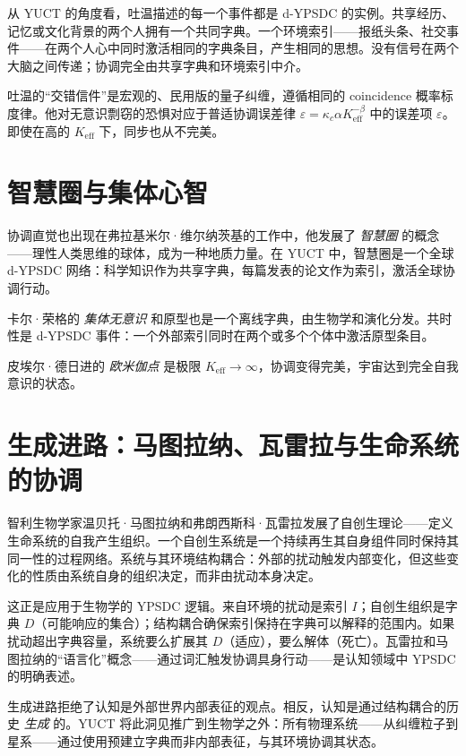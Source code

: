 \documentclass[12pt,a4paper]{article}
\begin{document}
	从 YUCT 的角度看，吐温描述的每一个事件都是 d-YPSDC 的实例。共享经历、记忆或文化背景的两个人拥有一个共同字典。一个环境索引——报纸头条、社交事件——在两个人心中同时激活相同的字典条目，产生相同的思想。没有信号在两个大脑之间传递；协调完全由共享字典和环境索引中介。
	
	吐温的“交错信件”是宏观的、民用版的量子纠缠，遵循相同的 coincidence 概率标度律。他对无意识剽窃的恐惧对应于普适协调误差律 \(\varepsilon = \kappa_c \alpha K_{\mathrm{eff}}^{-\beta}\) 中的误差项 \(\varepsilon\)。即使在高的 \(K_{\mathrm{eff}}\) 下，同步也从不完美。
	
	\section{智慧圈与集体心智}
	
	协调直觉也出现在弗拉基米尔·维尔纳茨基的工作中，他发展了 \emph{智慧圈} 的概念——理性人类思维的球体，成为一种地质力量。在 YUCT 中，智慧圈是一个全球 d-YPSDC 网络：科学知识作为共享字典，每篇发表的论文作为索引，激活全球协调行动。
	
	卡尔·荣格的 \emph{集体无意识} 和原型也是一个离线字典，由生物学和演化分发。共时性是 d-YPSDC 事件：一个外部索引同时在两个或多个个体中激活原型条目。
	
	皮埃尔·德日进的 \emph{欧米伽点} 是极限 \(K_{\mathrm{eff}} \to \infty\)，协调变得完美，宇宙达到完全自我意识的状态。
	
	\section{生成进路：马图拉纳、瓦雷拉与生命系统的协调}
	
	智利生物学家温贝托·马图拉纳和弗朗西斯科·瓦雷拉发展了自创生理论——定义生命系统的自我产生组织。一个自创生系统是一个持续再生其自身组件同时保持其同一性的过程网络。系统与其环境结构耦合：外部的扰动触发内部变化，但这些变化的性质由系统自身的组织决定，而非由扰动本身决定。
	
	这正是应用于生物学的 YPSDC 逻辑。来自环境的扰动是索引 \(I\)；自创生组织是字典 \(D\)（可能响应的集合）；结构耦合确保索引保持在字典可以解释的范围内。如果扰动超出字典容量，系统要么扩展其 \(D\)（适应），要么解体（死亡）。瓦雷拉和马图拉纳的“语言化”概念——通过词汇触发协调具身行动——是认知领域中 YPSDC 的明确表述。
	
	生成进路拒绝了认知是外部世界内部表征的观点。相反，认知是通过结构耦合的历史 \emph{生成} 的。YUCT 将此洞见推广到生物学之外：所有物理系统——从纠缠粒子到星系——通过使用预建立字典而非内部表征，与其环境协调其状态。
	
\end{document}
